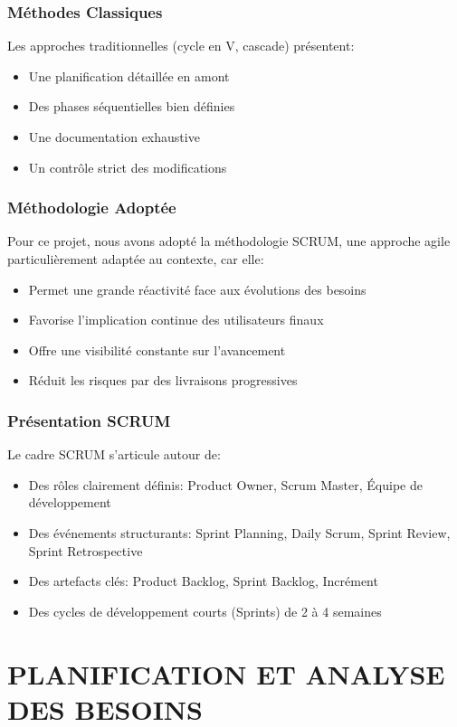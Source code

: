 \documentclass[12pt,a4paper]{report}
\begin{document}
\subsection{Méthodes Classiques}
Les approches traditionnelles (cycle en V, cascade) présentent:
\begin{itemize}
    \item Une planification détaillée en amont
    \item Des phases séquentielles bien définies
    \item Une documentation exhaustive
    \item Un contrôle strict des modifications
\end{itemize}

\subsection{Méthodologie Adoptée}
Pour ce projet, nous avons adopté la méthodologie SCRUM, une approche agile particulièrement adaptée au contexte, car elle:
\begin{itemize}
    \item Permet une grande réactivité face aux évolutions des besoins
    \item Favorise l'implication continue des utilisateurs finaux
    \item Offre une visibilité constante sur l'avancement
    \item Réduit les risques par des livraisons progressives
\end{itemize}

\subsection{Présentation SCRUM}
Le cadre SCRUM s'articule autour de:
\begin{itemize}
    \item Des rôles clairement définis: Product Owner, Scrum Master, Équipe de développement
    \item Des événements structurants: Sprint Planning, Daily Scrum, Sprint Review, Sprint Retrospective
    \item Des artefacts clés: Product Backlog, Sprint Backlog, Incrément
    \item Des cycles de développement courts (Sprints) de 2 à 4 semaines
\end{itemize}

\chapter{PLANIFICATION ET ANALYSE DES BESOINS}
\end{document}
